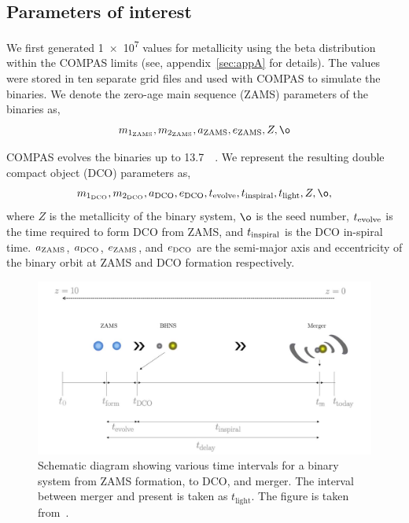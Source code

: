 
\subsection{Parameters of interest}
We first generated \num{1e7} values for metallicity using the beta distribution within the COMPAS limits (see, appendix~\ref{sec:appA} for details).
The values were stored in ten separate grid files and used with COMPAS to simulate the binaries.
We denote the zero-age main sequence (ZAMS) parameters of the binaries as,
\begin{equation}%
    \mone{ZAMS}, \mtwo{ZAMS}, \semaxis{ZAMS}, \ecc{ZAMS}, Z, \o
\end{equation}%

COMPAS evolves the binaries up to \SI{13.7}{\giga\yr}.
We represent the resulting double compact object (DCO) parameters as,
\begin{equation}%
    \mone{DCO}, \mtwo{DCO}, \semaxis{DCO}, \ecc{DCO}, \interval{evolve}, \interval{inspiral}, \interval{light}, Z, \o,
\end{equation}%
where $Z$ is the metallicity of the binary system, $\o$ is the seed number, $t_\text{evolve}$ is the time required to form DCO from ZAMS, and $t_\text{inspiral}$ is the DCO in-spiral time. $a_{\text{ZAMS}}$, $a_{\text{DCO}}$, $e_\text{ZAMS}$, and $e_\text{DCO}$ are the semi-major axis and eccentricity of the binary orbit at ZAMS and DCO formation respectively.
\begin{figure}[!ht]%
    \centering
    \includegraphics[width=\linewidth]{images/binary_evolution}
    \caption{Schematic diagram showing various time intervals for a binary system from ZAMS formation, to DCO, and merger. The interval between merger and present is taken as $t_\text{light}$. The figure is taken from~\cite{Riley2022}.}
    \label{fig:binaryevolution}
\end{figure}%

